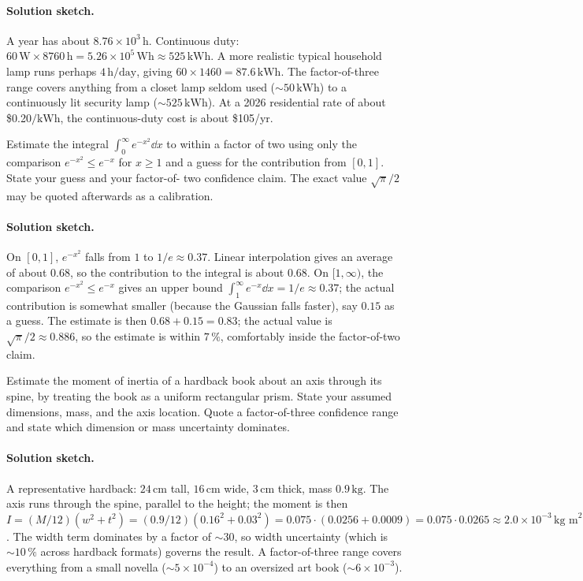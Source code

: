 \paragraph{Solution sketch.}
A year has about $8.76 \times 10^{3}\,\text{h}$. Continuous duty:
$60\,\si{\watt} \times 8760\,\text{h} = 5.26 \times 10^{5}\,
\text{Wh} \approx 525\,\text{kWh}$. A more realistic typical
household lamp runs perhaps $4\,\text{h}/\text{day}$, giving
$60 \times 1460 = 87.6\,\text{kWh}$. The factor-of-three range
covers anything from a closet lamp seldom used ($\sim 50\,
\text{kWh}$) to a continuously lit security lamp ($\sim 525\,
\text{kWh}$). At a 2026 residential rate of about
\$0.20$/\text{kWh}$, the continuous-duty cost is about \$105/yr.

\begin{exercise}
Estimate the integral $\int_{0}^{\infty} e^{-x^{2}} \dd x$ to within
a factor of two using only the comparison
$e^{-x^{2}} \leq e^{-x}$ for $x \geq 1$ and a guess for the
contribution from $[0, 1]$. State your guess and your factor-of-
two confidence claim. The exact value $\sqrt{\pi}/2$ may be quoted
afterwards as a calibration.
\end{exercise}

\paragraph{Solution sketch.}
On $[0, 1]$, $e^{-x^{2}}$ falls from $1$ to $1/e \approx 0.37$.
Linear interpolation gives an average of about $0.68$, so the
contribution to the integral is about $0.68$. On $[1, \infty)$,
the comparison $e^{-x^{2}} \leq e^{-x}$ gives an upper bound
$\int_{1}^{\infty} e^{-x} \dd x = 1/e \approx 0.37$; the actual
contribution is somewhat smaller (because the Gaussian falls
faster), say $0.15$ as a guess. The estimate is then $0.68 + 0.15
= 0.83$; the actual value is $\sqrt{\pi}/2 \approx 0.886$, so the
estimate is within $7\,\%$, comfortably inside the factor-of-two
claim.

\begin{exercise}
Estimate the moment of inertia of a hardback book about an axis
through its spine, by treating the book as a uniform rectangular
prism. State your assumed dimensions, mass, and the axis location.
Quote a factor-of-three confidence range and state which dimension
or mass uncertainty dominates.
\end{exercise}

\paragraph{Solution sketch.}
A representative hardback: $24\,\text{cm}$ tall, $16\,\text{cm}$
wide, $3\,\text{cm}$ thick, mass $0.9\,\text{kg}$. The axis runs
through the spine, parallel to the height; the moment is then
$I = (M/12)(w^{2} + t^{2}) = (0.9/12)(0.16^{2} + 0.03^{2}) =
0.075 \cdot (0.0256 + 0.0009) = 0.075 \cdot 0.0265 \approx 2.0
\times 10^{-3}\,\text{kg m}^{2}$. The width term dominates by a
factor of $\sim 30$, so width uncertainty (which is $\sim 10\,\%$
across hardback formats) governs the result. A factor-of-three
range covers everything from a small novella ($\sim 5 \times 10
^{-4}$) to an oversized art book ($\sim 6 \times 10^{-3}$).

